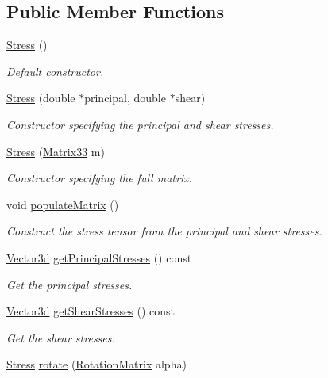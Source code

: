 \subsection*{Public Member Functions}
\begin{DoxyCompactItemize}
\item 
\hyperlink{classStress_aa01e83a3f6791cbadc5a368e3a40515e}{Stress} ()
\begin{DoxyCompactList}\small\item\em Default constructor. \end{DoxyCompactList}\item 
\hyperlink{classStress_ae4e2f6250e3bdd4d3d78a9c6bdde7bab}{Stress} (double $\ast$principal, double $\ast$shear)
\begin{DoxyCompactList}\small\item\em Constructor specifying the principal and shear stresses. \end{DoxyCompactList}\item 
\hyperlink{classStress_a267d09256246063f83de6e747d1bfe00}{Stress} (\hyperlink{classMatrix33}{Matrix33} m)
\begin{DoxyCompactList}\small\item\em Constructor specifying the full matrix. \end{DoxyCompactList}\item 
void \hyperlink{classStress_aa395d5763df8feb4689e0c5524c9e562}{populate\-Matrix} ()
\begin{DoxyCompactList}\small\item\em Construct the stress tensor from the principal and shear stresses. \end{DoxyCompactList}\item 
\hyperlink{classVector3d}{Vector3d} \hyperlink{classStress_a8e611f68135ec71c1c4bdad7a16c4ac7}{get\-Principal\-Stresses} () const 
\begin{DoxyCompactList}\small\item\em Get the principal stresses. \end{DoxyCompactList}\item 
\hyperlink{classVector3d}{Vector3d} \hyperlink{classStress_a9c25c029485d2e3acb7989ce9a05462a}{get\-Shear\-Stresses} () const 
\begin{DoxyCompactList}\small\item\em Get the shear stresses. \end{DoxyCompactList}\item 
\hyperlink{classStress}{Stress} \hyperlink{classStress_a8bbcd34d10748bf6febd32213ac5bf8e}{rotate} (\hyperlink{classRotationMatrix}{Rotation\-Matrix} alpha)

\end{DoxyCompactItemize}
